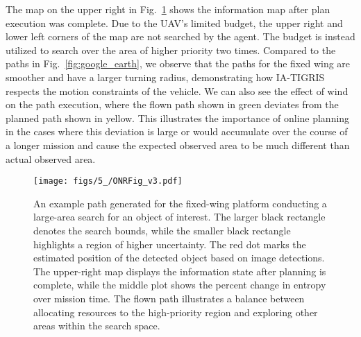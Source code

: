 The map on the upper right in Fig.~\ref{fig:fwd} shows the information map after plan execution was complete. Due to the UAV's limited budget, the upper right and lower left corners of the map are not searched by the agent. The budget is instead utilized to search over the area of higher priority two times. Compared to the paths in Fig.~\ref{fig:google_earth}, we observe that the paths for the fixed wing are smoother and have a larger turning radius, demonstrating how IA-TIGRIS respects the motion constraints of the vehicle. We can also see the effect of wind on the path execution, where the flown path shown in green deviates from the planned path shown in yellow. This illustrates the importance of online planning in the cases where this deviation is large or would accumulate over the course of a longer mission and cause the expected observed area to be much different than actual observed area. 

\begin{figure}[t]
\centering
\texttt{[image: figs/5\_/ONRFig\_v3.pdf]}
\caption{An example path generated for the fixed-wing platform conducting a large-area search for an object of interest. The larger black rectangle denotes the search bounds, while the smaller black rectangle highlights a region of higher uncertainty. The red dot marks the estimated position of the detected object based on image detections. The upper-right map displays the information state after planning is complete, while the middle plot shows the percent change in entropy over mission time. The flown path illustrates a balance between allocating resources to the high-priority region and exploring other areas within the search space.}
\label{fig:fwd}
\end{figure}







